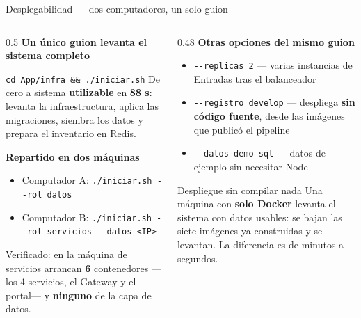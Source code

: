 \documentclass[aspectratio=169,10pt,xcolor={table}]{beamer}
\newcommand{\cifra}[1]{{\color{hexaacento}\textbf{#1}}}
\begin{document}
\begin{frame}{Desplegabilidad --- dos computadores, un solo guion}
  \begin{columns}[T]
    \begin{column}{0.5\textwidth}
      \scriptsize
      \textbf{Un único guion levanta el sistema completo}
      \begin{block}{\texttt{cd App/infra \&\& ./iniciar.sh}}
        \scriptsize De cero a sistema \textbf{utilizable} en \cifra{88 s}: levanta la
        infraestructura, aplica las migraciones, siembra los datos y prepara el inventario en
        Redis.
      \end{block}
      \vspace{0.4em}
      \textbf{Repartido en dos máquinas}
      \begin{itemize}\scriptsize
        \item Computador A: \texttt{./iniciar.sh -{}-rol datos}
        \item Computador B: \texttt{./iniciar.sh -{}-rol servicios -{}-datos <IP>}
      \end{itemize}
      \vspace{0.3em}
      \scriptsize
      Verificado: en la máquina de servicios arrancan \cifra{6} contenedores ---los 4 servicios,
      el Gateway y el portal--- y \textbf{ninguno} de la capa de datos.
    \end{column}
    \begin{column}{0.48\textwidth}
      \scriptsize
      \textbf{Otras opciones del mismo guion}
      \begin{itemize}\scriptsize
        \item \texttt{-{}-replicas 2} --- varias instancias de Entradas tras el balanceador
        \item \texttt{-{}-registro develop} --- despliega \textbf{sin código fuente}, desde las
              imágenes que publicó el pipeline
        \item \texttt{-{}-datos-demo sql} --- datos de ejemplo sin necesitar Node
      \end{itemize}
      \vspace{0.5em}
      \begin{alertblock}{Despliegue sin compilar nada}
        \scriptsize Una máquina con \textbf{solo Docker} levanta el sistema con datos usables:
        se bajan las siete imágenes ya construidas y se levantan. La diferencia es de minutos a
        segundos.
      \end{alertblock}
    \end{column}
  \end{columns}
\end{frame}
\end{document}
